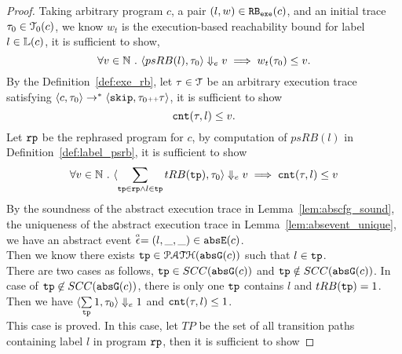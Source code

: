   \begin{proof}
        Taking arbitrary program $c$, a pair  $(l, w) \in \mathtt{RB_{exe}}(c)$, 
        and an initial trace $\mathtt{\tau}_0 \in \mathcal{T}_0(c)$,  
        we know $w_t$ is the execution-based 
        reachability bound 
        for label $l \in \mathbb{L}(c)$, 
        it is sufficient to show,
        \[
            \forall v \in \mathbb{N} ~.~ \langle psRB(l), \mathtt{\tau}_0 \rangle \Downarrow_e v
            \implies w_{t}(\mathtt{\tau}_0) \leq v.\]
        By the Definition~\ref{def:exe_rb}, 
        let $\mathtt{\tau} \in \mathcal{T}$ be an arbitrary execution trace 
        satisfying 
        $\langle {c}, \mathtt{\tau}_0 \rangle \to^{*} \langle \mathtt{skip}, \mathtt{\tau}_0 {\scriptscriptstyle ++} \mathtt{\tau} \rangle $,
        it is sufficient to show 
        \[
            \mathtt{cnt}(\mathtt{\tau}, l) \leq v.
        \]
        Let $\mathtt{rp}$ be the rephrased program for $c$,
        by computation of $psRB(l)$ in Definition~\ref{def:label_psrb}, it is sufficient to show 
        \[
          \forall v \in \mathbb{N} ~.~ 
          \langle \sum\limits_{\mathtt{tp} \in \mathtt{rp} \land 
          l \in \mathtt{tp}} tRB(\mathtt{tp}), \mathtt{\tau}_0
           \rangle \Downarrow_e v \implies  \mathtt{cnt}(\mathtt{\tau}, l) \leq v\]
          By the soundness of the abstract execution trace in Lemma~\ref{lem:abscfg_sound}, 
          the uniqueness of the abstract execution trace in Lemma~\ref{lem:absevent_unique},
          we have an abstract event $\stackrel{\scriptscriptstyle{\alpha}}{\mathtt{\epsilon}{}} = (l, \_, \_) \in \mathtt{abs}{\mathtt{E}}(c)$.
          \\
          Then we know there exists $\mathtt{tp} \in \mathcal{PATH}(\mathtt{abs}{\mathtt{G}}(c))$ such that 
          $l \in \mathtt{tp}$.
          \\
          There are two cases as follows,
        $\mathtt{tp} \in SCC(\mathtt{abs}{\mathtt{G}}(c))$ and $\mathtt{tp} \notin SCC(\mathtt{abs}{\mathtt{G}}(c))$.
          In case of  $\mathtt{tp} \not\in SCC(\mathtt{abs}{\mathtt{G}}(c))$, there is only one $\mathtt{tp}$ contains $l$ and $tRB(\mathtt{tp}) = 1$.
          \\
          Then we have $\langle \sum\limits_{\mathtt{tp}} 1, \mathtt{\tau}_0
           \rangle \Downarrow_e 1$ and $ \mathtt{cnt}(\mathtt{\tau}, l) \leq 1$.
          \\
          This case is proved.
          In this case, let $TP$ be the set of all transition paths containing 
          label $l$ in program $\mathtt{rp}$, then it is sufficient to show 

\end{proof}
